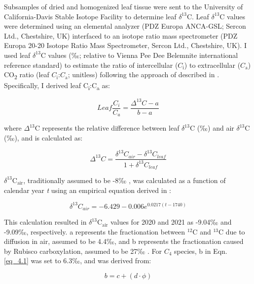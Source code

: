 Subsamples of dried and homogenized leaf tissue were sent to the University of California-Davis Stable Isotope Facility to determine leaf $\delta^{13}$C. Leaf $\delta^{13}$C values were determined using an elemental analyzer (PDZ Europa ANCA-GSL; Sercon Ltd., Chestshire, UK) interfaced to an isotope ratio mass spectrometer (PDZ Europa 20-20 Isotope Ratio Mass Spectrometer, Sercon Ltd., Chestshire, UK). I used leaf $\delta^{13}$C values (‰; relative to Vienna Pee Dee Belemnite international reference standard) to estimate the ratio of intercellular ($C_\mathrm{i}$) to extracellular ($C_\mathrm{a}$) CO\textsubscript{2} ratio (leaf $C_\mathrm{i}$:$C_\mathrm{a}$; unitless) following the approach of  described in . Specifically, I derived leaf C\textsubscript{i}:C\textsubscript{a} as:

\begin{equation} 
    \label{eq_4.1}
    Leaf \frac{C_{i}}{C_{a}}=\frac{\Delta^{13}C - a}{b - a}
\end{equation}
    
\noindent where $\Delta^{13}$C represents the relative difference between leaf $\delta^{13}$C (‰) and air $\delta^{13}$C (‰), and is calculated as:

\begin{equation}
    \label{eq_4.2}
    \Delta^{13}C = \frac{\delta^{13}C_{air} - \delta^{13}C_{leaf}}{1 + \delta^{13}C_{leaf}}
\end{equation}

\noindent $\delta^{13}\mathrm{C_{air}}$, traditionally assumed to be -8‰ , was calculated as a function of calendar year \textit{t} using an empirical equation derived in :

\begin{equation}
    \label{eq_4.3}
    \delta^{13}C_{air} = -6.429 - 0.006e^{0.0217(t-1740)}
\end{equation}
    
 \noindent This calculation resulted in $\delta^{13}\mathrm{C_{air}}$ values for 2020 and 2021 as -9.04‰ and -9.09‰, respectively. a represents the fractionation between $^{12}\mathrm{C}$ and $^{13}\mathrm{C}$ due to diffusion in air, assumed to be 4.4‰, and b represents the fractionation caused by Rubisco carboxylation, assumed to be 27‰ . For $C_{4}$ species, b in Eqn. \ref{eq_4.1} was set to 6.3‰, and was derived from:

\begin{equation}
    \label{eq_4.4}
    b = c + (d \cdot \phi)
\end{equation}
    
